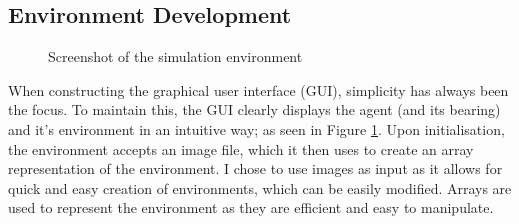 \documentclass[12pt]{article}
\begin{document}
\subsection{Environment Development}
\begin{figure}[H]
    \centering
    \caption{Screenshot of the simulation environment}
    \label{fig:environment_example}
\end{figure}
When constructing the graphical user interface (GUI), simplicity has always been the focus. To maintain this, the GUI clearly displays
the agent (and its bearing) and it's environment in an intuitive way; as seen in Figure \ref{fig:environment_example}. Upon
initialisation, the environment accepts an image file, which it then uses to create an array representation of the environment. I chose
to use images as input as it allows for quick and easy creation of environments, which can be easily modified. Arrays are used to
represent the environment as they are efficient and easy to manipulate.\\
\end{document}
